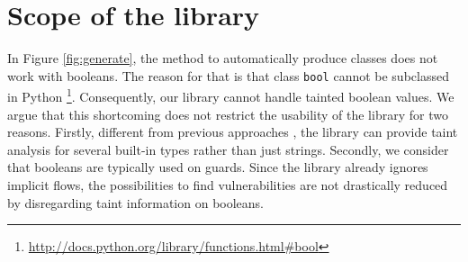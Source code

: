 
\section{Scope of the library}

In Figure \ref{fig:generate}, 
the method to automatically produce \nametklass classes does not 
work with booleans. 
The reason for that is that class \texttt{bool}
cannot be subclassed in Python 
\footnote{\url{http://docs.python.org/library/functions.html#bool}}.
Consequently, our library
cannot handle tainted boolean values. We argue that 
this shortcoming does not restrict the usability of the library for
 two reasons. Firstly, different from previous approaches 
\cite{Perl,Nguyen05,Jovanovic06pixy:a,KozlovPetukhov07,Futo07,SeoLam2010}, 
the library can provide taint analysis for several 
built-in types rather than just strings. Secondly, we consider that 
booleans are typically used on guards. 
Since the library already ignores implicit flows, 
the possibilities to find vulnerabilities
are not drastically reduced by disregarding taint information on booleans.

